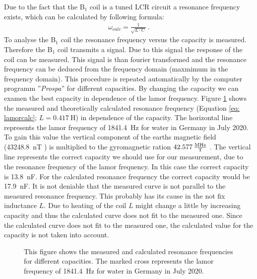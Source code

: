 Due to the fact that the B$_1$ coil is a tuned LCR circuit a resonance frequency exists, which can be calculated by following formula:
\begin{align}
    \omega_{calc} = \frac{1}{\sqrt{L \cdot C}} \ .
    \label{eq: lamorcalc}
\end{align}
To analyse the B$_1$ coil the resonance frequency versus the capacity is measured. Therefore the B$_1$ coil transmits a signal. Due to this signal the response of the coil can be measured. This signal is than fourier transformed and the resonance frequency can be deduced from the frequency domain (maxmimum in the frequency domain). This procedure is repeated automatically by the computer programm ''\textit{Prospa}'' for different capacities. By changing the capacity we can examen the best capacity in dependence of the lamor frequency. Figure \ref{fig: Coilanalyse} shows the measured and theoretically calculated resonance frequency (Equation \ref{eq: lamorcalc}; $L = \SI{0.417}{\henry}$) in dependence of the capacity. The horizontal line represents the lamor frequency of \SI{1841.4}{\hertz} for water in Germany in July 2020. To gain this value the vertical component of the earths magnetic field (\SI{43248.8}{\nano \tesla} \cite{magnetfeld}) is multiplied to the gyromagnetic ration $\SI{42.577}{\frac{\mega \hertz}{\tesla}}$ \cite{magnetfeld}. The vertical line represents the correct capacity we should use for our measurement, due to the resonance frequency of the lamor frequency. In this case the correct capacity is \SI{13.8}{\nano \farad}. For the calculated resonance frequency the correct capacity would be \SI{17.9}{\nano \farad}. It is not deniable that the measured curve is not parallel to the measured resonance frequency. This probably has its cause in the not fix inductance $L$. Due to heating of the coil $L$ might change a little by increasing capacity and thus the calculated curve does not fit to the measured one. Since the calculated curve does not fit to the measured one, the calculated value for the capacity is not taken into account.

\begin{figure}[H]
    \centering
    
    \caption[This figure shows the measured and calculated resonance frequencies for different capacities.]{This figure shows the measured and calculated resonance frequencies for different capacities. The marked cross represents the lamor frequency of \SI{1841.4}{\hertz} for water in Germany in July 2020.}
    \label{fig: Coilanalyse}
\end{figure}